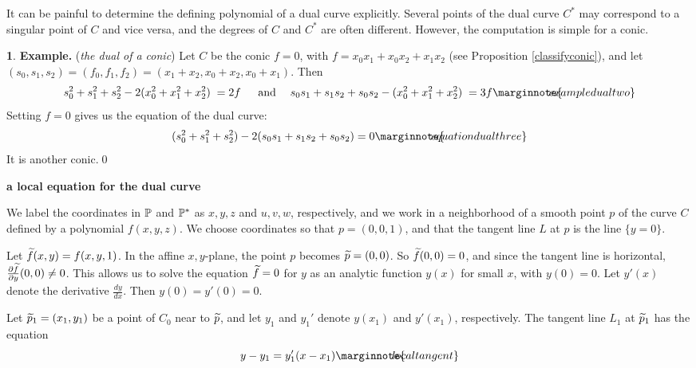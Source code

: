 \documentclass[leqno]{book}
\newcommand\Marginnote[1]{\marginnote{\hspace{-12pt}\normalfont{#1}}}
\renewcommand\theequation{\thesection.\arabic{equation}}
\newenvironment{boldequation}{\renewcommand\theequation{\textbf{\thesection.\arabic{equation}}}\equation}
   {\endequation}
\theoremstyle{definition}%
\numberwithin{equation}{section}
\newtheorem{example}[equation]{}
\theoremstyle{theorem} %
\begin{document}
\ms It can be painful to determine the defining polynomial of a dual
curve explicitly.  Several points of the dual curve $C^*$ may
correspond to a singular point of $C$ and vice versa, and the degrees
of $C$ and $C^*$ are often different.  However, the computation is
simple for a conic.

 \begin{example}{\bf Example.}\Marginnote{exampledualone}
\;\label{exampledualone}({\it the dual of a conic})\;
 Let $C$ be the conic $f =0$, with $f = x_0x_1+x_0x_2+x_1x_2$ (see
 Proposition \ref{classifyconic}), and let $(s_0,s_1,s_2) = (f_0,f_1,f_2) =
 (x_1\!+\!x_2,x_0\!+\!x_2,x_0\!+\!x_1)$.  Then
\begin{equation}s_0^2+s_1^2+s_2^2 - 2(x_0^2+x_1^2+x_2^2) \;= 2f\quad\;\;
\text{and}\quad\;  s_0s_1+s_1s_2+s_0s_2 - (x_0^2+x_1^2+x_2^2) \; = 3f
\Marginnote{exampledualtwo}\label{exampledualtwo} 
\end{equation}
 Setting $f=0$ gives us the equation  of the dual curve:
 \begin{equation}
 (s_0^2+s_1^2+s_2^2) - 2(s_0s_1+s_1s_2+s_0s_2) =
   0\Marginnote{equationdualthree}
 	\label{equationdualthree}
\end{equation}
It is another conic.\qed
\end{example}

\begin{boldequation}
\Marginnote{equationofcstar}\label{equationofcstar}
 \hspace{-7.5cm} 
\textbf{a local equation for the dual curve}
\end{boldequation}

 We label the coordinates in $\mathbb{P}$ and $\mathbb{P}^*$ as $x,y,z$ and
 $u,v,w$, respectively, and we work in a neighborhood of a smooth point $p$
 of the curve $C$ defined by a polynomial $f(x,y,z)$.  We choose
 coordinates so that $p = (0,0,1)$, and that the tangent line $L$ at
 $p$ is the line $\{y=0\}$.

 Let $\widetilde f(x,y) = f(x,y,1)$.  In the affine $x,y$-plane, the point $p$
 becomes $\widetilde p = (0,0)$.  So $\widetilde f(0,0)=0$, and since the tangent line
 is horizontal, $\frac {\partial \widetilde f}{\partial y}(0,0) \neq 0$.  This
 allows us to solve the equation $\widetilde f=0$ for $y$ as an analytic
 function $y(x)$ for small $x$, with $y(0)=0$.  Let $y'(x)$ denote
 the derivative $\frac {dy}{dx}$.  Then $y(0) = y'(0) =0$.

Let $\widetilde p_1 = (x_1,y_1)$ be a point of $C_0$ near to $\widetilde p$, and let
$y_1$ and $y_1'$ denote $y(x_1)$  and $y'(x_1)$, respectively. The
tangent line $L_1$ at $\widetilde p_1$ has the equation
\begin{equation}
  y-y_1= y'_1(x-x_1)\Marginnote{localtangent}	
  \label{localtangent}
\end{equation}
\end{document}
